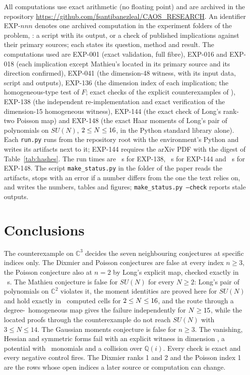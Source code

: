 \documentclass[11pt]{article}
\theoremstyle{remark}
\newcommand{\C}{\mathbb{C}}
\newcommand{\Q}{\mathbb{Q}}
\newcommand{\EXP}[1]{\mbox{EXP-#1}}
\begin{document}
{\raggedright
All computations use exact arithmetic (no floating point) and are archived in the repository \url{https://github.com/fsantibanezleal/CAOS_RESEARCH}. An identifier EXP-$nnn$ denotes one archived computation in the experiment folders of the problem, : a script with its output, or a check of published implications against their primary sources; each states its question, method and result. The computations used are \EXP{001} (exact validation, full fibre), \EXP{016} and \EXP{018} (each implication except Mathieu's located in its primary source and its direction confirmed), \EXP{041} (the dimension-48 witness, with its input data, script and outputs), \EXP{136} (the dimension index of each implication; the homogeneous-type test of $F$; exact checks of the explicit counterexamples of \cite{Long2026, LongSU2}), \EXP{138} (the independent re-implementation and exact verification of the dimension-15 homogeneous witness), \EXP{144} (the exact check of Long's rank-two Poisson map) and \EXP{148} (the exact Haar moments of Long's pair of polynomials on $SU(N)$, $2\le N\le16$, in the Python standard library alone). Each \texttt{run.py} runs from the repository root with the environment's Python and writes its artifacts next to it; \EXP{144} requires the arXiv PDF with the digest of Table~\ref{tab:hashes}. The run times are \nhomseconds\ s for \EXP{138}, \npoissonseconds\ s for \EXP{144} and \nmcseconds\ s for \EXP{148}. The script \texttt{make\_status.py} in the folder of the paper reads the artifacts, stops with an error if a number differs from the one the text relies on, and writes the numbers, tables and figures; \texttt{make\_status.py --check} reports stale outputs.\par}

\section{Conclusions}\label{sec:conclusions}

The counterexample on $\C^3$ decides the seven neighbouring conjectures at specific indices only. The Dixmier and Poisson conjectures are false at every index $n\ge3$, the Poisson conjecture also at $n=2$ by Long's explicit map, checked exactly in \npoissonseconds\ s. The Mathieu conjecture is false for $SU(N)$ for every $N\ge2$: Long's pair of polynomials on $\C^2$ violates it, the moment identities are proved here for $SU(N)$ and hold exactly in \nmccells\ computed cells for $2\le N\le16$, and the route through a degree-\nhomdeg\ homogeneous map gives the failure independently for $N\ge15$, while the located proofs through the counterexample do not reach $SU(N)$ with $3\le N\le14$. The Gaussian moments conjecture is false for $n\ge3$. The vanishing, Hessian and symmetric forms fail with an explicit witness in dimension \nwitnessdim, a potential with \npotentialmon\ monomials and a collision over $\Q(i)$. Every check is exact and every negative control fires. The Dixmier ranks 1 and 2 and the Poisson index 1 are the rows whose open indices a later source or computation can change.
\end{document}
